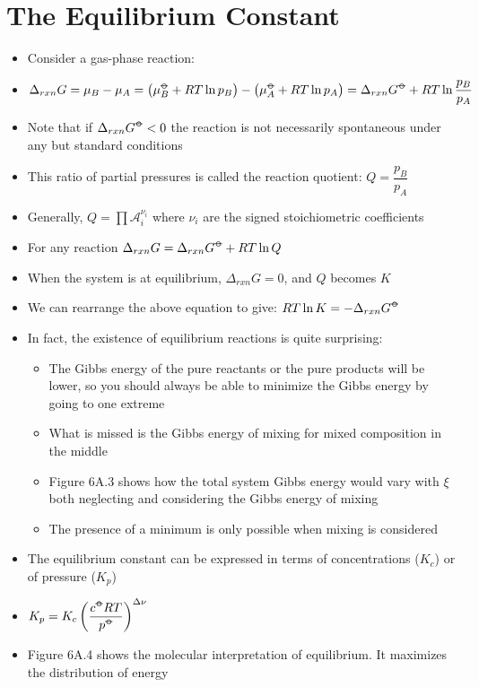 \documentclass[12pt, openany, letterpaper]{memoir}
\begin{document}
\section{The Equilibrium Constant}
\begin{itemize}
	\item Consider a gas-phase reaction: 
	\item $\Delta_{rxn}G = \mu_B-\mu_A = \left(\mu_B^{\std}+RT\ln p_B\right)-\left(\mu_A^{\std}+RT\ln p_A\right)=\Delta_{rxn}G^{\std} + RT\ln\dfrac{p_B}{p_A}$
	\item Note that if $\Delta_{rxn}G^{\std}<0$ the reaction is not necessarily spontaneous under any but standard conditions
	\item This ratio of partial pressures is called the reaction quotient: $Q=\dfrac{p_B}{p_A}$
	\item Generally, $Q=\prod\mathcal{A}_i^{\nu_i}$ where $\nu_i$ are the signed stoichiometric coefficients
	\item For any reaction $\Delta_{rxn}G = \Delta_{rxn}G^{\std} + RT\ln Q$	
	\item When the system is at equilibrium, $\Delta_{rxn}G=0$, and $Q$ becomes $K$
	\item We can rearrange the above equation to give: $RT\ln K = -\Delta_{rxn}G^{\std}$
	\item In fact, the existence of equilibrium reactions is quite surprising:
	\begin{itemize}
		\item The Gibbs energy of the pure reactants or the pure products will be lower, so you should always be able to minimize the Gibbs energy by going to one extreme
		\item What is missed is the Gibbs energy of mixing for mixed composition in the middle
		\item Figure 6A.3 shows how the total system Gibbs energy would vary with $\xi$ both neglecting and considering the Gibbs energy of mixing
		\item The presence of a minimum is only possible when mixing is considered
	\end{itemize}
	\item The equilibrium constant can be expressed in terms of concentrations ($K_c$) or of pressure ($K_p$)
	\item $K_p=K_c\left(\dfrac{c^{\std}RT}{p^{\std}}\right)^{\Delta \nu}$
	\item Figure 6A.4 shows the molecular interpretation of equilibrium. It maximizes the distribution of energy
\end{itemize}
	
\end{document}
